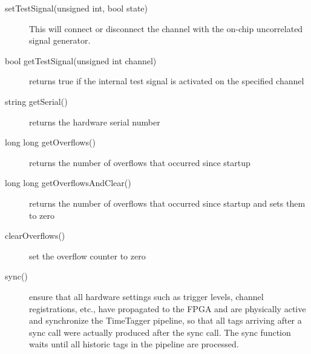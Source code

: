 \documentclass[letterpaper,10pt,english]{sphinxmanual}
\begin{document}
\begin{description}
\item[{setTestSignal(unsigned int, bool state)}] \leavevmode
This will connect or disconnect the channel with the on-chip
uncorrelated signal generator.

\item[{bool getTestSignal(unsigned int channel)}] \leavevmode
returns true if the internal test signal is activated on the specified channel

\item[{string getSerial()}] \leavevmode
returns the hardware serial number

\item[{long long getOverflows()}] \leavevmode
returns the number of overflows that occurred since startup

\item[{long long getOverflowsAndClear()}] \leavevmode
returns the number of overflows that occurred since startup and sets them to zero

\item[{clearOverflows()}] \leavevmode
set the overflow counter to zero

\item[{sync()}] \leavevmode
ensure that all hardware settings such as trigger levels,
channel registrations, etc., have propagated to the FPGA
and are physically active and synchronize the TimeTagger pipeline,
so that all tags arriving after a sync call were actually produced
after the sync call. The sync function waits until all historic
tags in the pipeline are processed.

\end{description}
\end{document}

